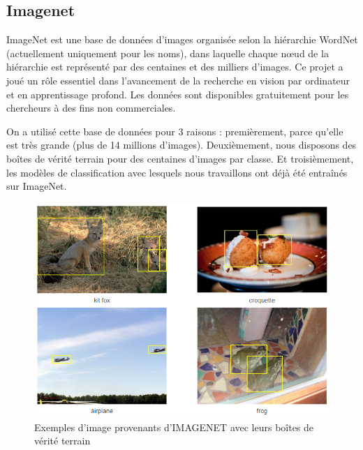 \documentclass{report}
\begin{document}
{\subsection{Imagenet}

\hspace{1.6cm}ImageNet\cite{ILSVRC15} est une base de données d'images organisée selon la hiérarchie WordNet (actuellement uniquement pour les noms), dans laquelle chaque nœud de la hiérarchie est représenté par des centaines et des milliers d'images. Ce projet a joué un rôle essentiel dans l'avancement de la recherche en vision par ordinateur et en apprentissage profond. Les données sont disponibles gratuitement pour les chercheurs à des fins non commerciales.

\hspace{1.6cm}On a utilisé cette base de données pour 3 raisons : premièrement, parce qu'elle est très grande (plus de 14 millions d'images). Deuxièmement, nous disposons des boîtes de vérité terrain pour des centaines d'images par classe. Et troisièmement, les modèles de classification avec lesquels nous travaillons ont déjà été entraînés sur ImageNet.

\begin{figure}[htbp] 
	\centering
        \includegraphics[width=11.3cm]{logo/Imagenet_bb.png} 
	\caption{Exemples d'image provenants d'IMAGENET avec leurs boîtes de vérité terrain}
	\label{fig:Exemples d'image provenants d'IMAGENET avec leurs boîtes de vérité terrain}
\end{figure}

}
\end{document}
